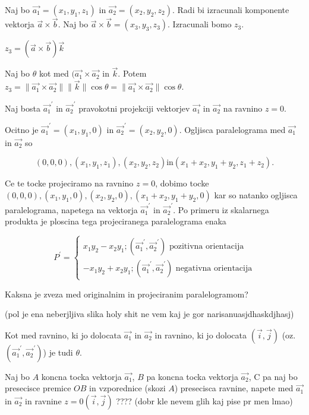 \documentclass{report}
\begin{document}

Naj bo $\vec{a_1} = (x_1,y_1,z_1)$ in $\vec{a_2} = (x_2,y_2,z_2)$. Radi bi izracunali komponente vektorja $\vec{a} \times \vec{b}$.
Naj bo $\vec{a} \times \vec{b} = (x_3,y_3,z_3)$. Izracunali bomo $z_3$.

$z_3 = (\vec{a} \times \vec{b}) \vec{k}$

Naj bo $\theta$ kot med $(\vec{a_1} \times \vec{a_2}$ in $\vec{k}$. Potem $z_3 = \| \vec{a_1} \times \vec{a_2}  \| \|\vec{k}\| \cos \theta = \|\vec{a_1} \times \vec{a_2}\| \cos \theta$.

Naj bosta $\vec{a_1}^{\prime}$ in $\vec{a_2}^{\prime}$ pravokotni projekciji vektorjev $\vec{a_1}$ in $\vec{a_2}$ na ravnino $z=0$.


Ocitno je $\vec{a_1}^{\prime} = (x_1,y_1, 0)$ in $\vec{a_2}^{\prime} = (x_2,y_2,0)$. Ogljisca paralelograma med $\vec{a_1}$ in $\vec{a_2}$ so

\[
	(0,0,0), (x_1,y_1,z_1), (x_2,y_2,z_2) \text{in} (x_1 + x_2, y_1 + y_2, z_1 + z_2)
.\]


Ce te tocke projeciramo na ravnino $z=0$, dobimo tocke  $(0,0,0), (x_1,y_1,0), (x_2,y_2,0), (x_1 + x_2, y_1 + y_2,0)$ kar so natanko ogljisca paralelograma, napetega na vektorja $\vec{a_1}^{\prime}$ in $\vec{a_2}^{\prime}$. Po primeru iz skalarnega produkta je ploscina tega projeciranega paralelograma enaka

\[
P^{\prime} = \begin{cases}
	x_1 y_2 - x_2 y_1 ; (\vec{a_1}^{\prime}, \vec{a_2}^{\prime}) \text{  pozitivna orientacija} \\
	-x_1 y_2 + x_2 y_1 ; (\vec{a_1}^{\prime}, \vec{a_2}^{\prime}) \text{  negativna orientacija}
	\end{cases}
\]

Kaksna je zveza med originalnim in projeciranim paralelogramom?



(pol je ena neberjljiva slika holy shit ne vem kaj je gor narisanuasjdhaskdjhasj)



Kot med ravnino, ki jo dolocata $\vec{a_1}$ in $\vec{a_2}$ in ravnino, ki jo dolocata $(\vec{i}, \vec{j})$ (oz. $(\vec{a_1}^{\prime},\vec{a_2}^{\prime})$) je tudi $\theta$.

Naj bo $A$ koncna tocka vektorja  $\vec{a_1}$, $B$ pa koncna tocka vektorja  $\vec{a_2}$, C pa naj bo presecisce premice $OB$ in vzporednice (skozi  $A$) presecisca ravnine, napete med  $\vec{a_1}$ in $\vec{a_2}$ in ravnine $z=0 (\vec{i}, \vec{j})$ ???? (dobr kle nevem glih kaj pise pr men lmao)
\end{document}
